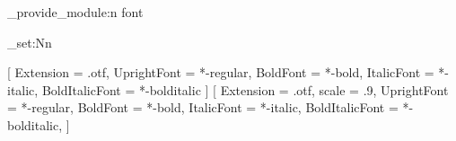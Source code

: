 \hduthesis_provide_module:n {font}

\RequirePackage[zihao = -4]{ctex}
\linespread{1.39}
\dim_set:Nn \parindent {2\ccwd}
\newcommand\semilarge{\@setfontsize\semilarge{14}{16.5}}
\newcommand\semiLarge{\@setfontsize\semiLarge{16.5}{18}}

\setmainfont{texgyretermes}
  [
    Extension = .otf, UprightFont = *-regular, BoldFont = *-bold,
    ItalicFont = *-italic, BoldItalicFont = *-bolditalic
  ]
\setsansfont{texgyreheros}
  [
    Extension = .otf, scale = .9, UprightFont = *-regular, BoldFont = *-bold,
    ItalicFont = *-italic, BoldItalicFont = *-bolditalic,
  ]

\RequirePackage { amsmath, amssymb, mathtools, extarrows,
                  bm, cancel, physics2, fixdif, derivative }

\endinput
